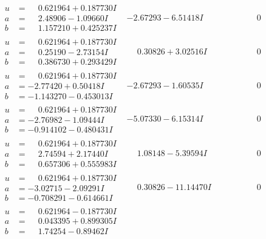 \documentclass[1p]{elsarticle_modified}
\theoremstyle{definition}
\begin{document}
$$\begin{array}{c|c|c}
\begin{aligned}
u &= \phantom{-}0.621964 + 0.187730 I \\
a &= \phantom{-}2.48906 - 1.09660 I \\
b &= \phantom{-}1.157210 + 0.425237 I\end{aligned}
 & -2.67293 - 6.51418 I & \phantom{-0.000000 } 0 \\ \hline\begin{aligned}
u &= \phantom{-}0.621964 + 0.187730 I \\
a &= \phantom{-}0.25190 - 2.73154 I \\
b &= \phantom{-}0.386730 + 0.293429 I\end{aligned}
 & \phantom{-}0.30826 + 3.02516 I & \phantom{-0.000000 } 0 \\ \hline\begin{aligned}
u &= \phantom{-}0.621964 + 0.187730 I \\
a &= -2.77420 + 0.50418 I \\
b &= -1.143270 - 0.453013 I\end{aligned}
 & -2.67293 - 1.60535 I & \phantom{-0.000000 } 0 \\ \hline\begin{aligned}
u &= \phantom{-}0.621964 + 0.187730 I \\
a &= -2.76982 - 1.09444 I \\
b &= -0.914102 - 0.480431 I\end{aligned}
 & -5.07330 - 6.15314 I & \phantom{-0.000000 } 0 \\ \hline\begin{aligned}
u &= \phantom{-}0.621964 + 0.187730 I \\
a &= \phantom{-}2.74594 + 2.17440 I \\
b &= \phantom{-}0.657306 + 0.555983 I\end{aligned}
 & \phantom{-}1.08148 - 5.39594 I & \phantom{-0.000000 } 0 \\ \hline\begin{aligned}
u &= \phantom{-}0.621964 + 0.187730 I \\
a &= -3.02715 - 2.09291 I \\
b &= -0.708291 - 0.614661 I\end{aligned}
 & \phantom{-}0.30826 - 11.14470 I & \phantom{-0.000000 } 0 \\ \hline\begin{aligned}
u &= \phantom{-}0.621964 - 0.187730 I \\
a &= \phantom{-}0.043395 + 0.899305 I \\
b &= \phantom{-}1.74254 - 0.89462 I\end{aligned}

\end{array}$$
\end{document}
